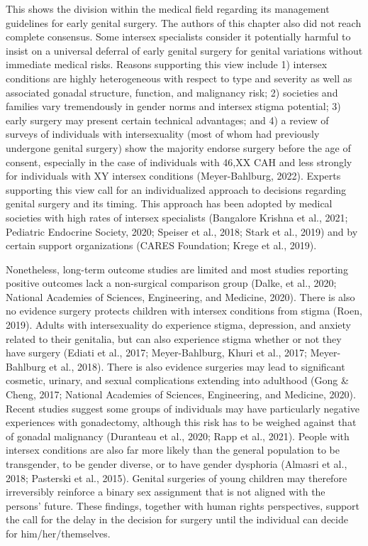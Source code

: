 \documentclass[
]{book}
\begin{document}
This shows the division within the medical
field regarding its management guidelines for
early genital surgery. The authors of this chapter
also did not reach complete consensus. Some
intersex specialists consider it potentially harmful
to insist on a universal deferral of early genital
surgery for genital variations without immediate
medical risks. Reasons supporting this view
include 1) intersex conditions are highly heterogeneous with respect to type and severity as well
as associated gonadal structure, function, and
malignancy risk; 2) societies and families vary
tremendously in gender norms and intersex
stigma potential; 3) early surgery may present
certain technical advantages; and 4) a review of
surveys of individuals with intersexuality (most
of whom had previously undergone genital surgery) show the majority endorse surgery before
the age of consent, especially in the case of individuals with 46,XX CAH and less strongly for
individuals with XY intersex conditions
(Meyer-Bahlburg, 2022). Experts supporting this
view call for an individualized approach to
decisions regarding genital surgery and its timing.
This approach has been adopted by medical societies with high rates of intersex specialists
(Bangalore Krishna et al., 2021; Pediatric
Endocrine Society, 2020; Speiser et al., 2018;
Stark et al., 2019) and by certain support organizations (CARES Foundation; Krege et al., 2019).

Nonetheless, long-term outcome studies are
limited and most studies reporting positive outcomes lack a non-surgical comparison group
(Dalke, et al., 2020; National Academies of
Sciences, Engineering, and Medicine, 2020). There
is also no evidence surgery protects children with
intersex conditions from stigma (Roen, 2019).
Adults with intersexuality do experience stigma,
depression, and anxiety related to their genitalia,
but can also experience stigma whether or not
they have surgery (Ediati et al., 2017;
Meyer-Bahlburg, Khuri et al., 2017; Meyer-Bahlburg
et al., 2018). There is also evidence surgeries may
lead to significant cosmetic, urinary, and sexual
complications extending into adulthood (Gong \&
Cheng, 2017; National Academies of Sciences,
Engineering, and Medicine, 2020). Recent studies
suggest some groups of individuals may have particularly negative experiences with gonadectomy,
although this risk has to be weighed against that
of gonadal malignancy (Duranteau et al., 2020;
Rapp et al., 2021). People with intersex conditions
are also far more likely than the general population to be transgender, to be gender diverse, or
to have gender dysphoria (Almasri et al., 2018;
Pasterski et al., 2015). Genital surgeries of young
children may therefore irreversibly reinforce a
binary sex assignment that is not aligned with
the persons' future. These findings, together with
human rights perspectives, support the call for
the delay in the decision for surgery until the
individual can decide for him/her/themselves.
\end{document}
